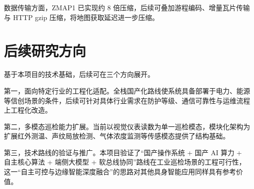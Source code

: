 数据传输方面，ZMAP1 已实现约 8 倍压缩，后续可叠加游程编码、增量瓦片传输与 HTTP gzip 压缩，将地图获取延迟进一步压缩。

\section{后续研究方向}
\label{sec:future-work}

基于本项目的技术基础，后续可在三个方向展开。

第一，面向特定行业的工程化适配。全栈国产化路线使系统具备部署于电力、能源等信创场景的条件，后续可针对具体行业需求在防护等级、通信可靠性与运维流程上工程化改造。

第二，多模态巡检能力扩展。当前以视觉仪表读数为单一巡检模态，模块化架构为扩展红外测温、声纹局放检测、气体浓度监测等传感模态提供了结构基础。

第三，技术路线的验证与推广。本项目验证了“国产操作系统 + 国产 AI 算力 + 自主核心算法 + 端侧大模型 + 软总线协同”路线在工业巡检场景的工程可行性，这一“自主可控与边缘智能深度融合”的思路对其他具身智能应用同样具有参考价值。
